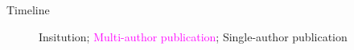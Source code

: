 \begin{frame}{Timeline}

  \vspace{-2em}
\begin{figure}[t!] \centering
        
        \caption{\textcolor[RGB]{32,74,135}{Insitution}; \textcolor{magenta}{Multi-author publication}; \textcolor[RGB]{78,154,0}{Single-author publication}}
\end{figure}

\end{frame}

